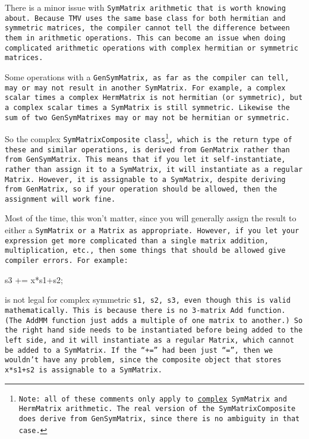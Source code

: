 There is a minor issue with \tt{SymMatrix} arithmetic that is
worth knowing about.
Because TMV uses the same base class for both hermitian and symmetric
matrices, the compiler cannot tell the difference between them in arithmetic
operations.  
This can become an issue when doing complicated arithmetic operations
with complex hermitian or symmetric matrices.

Some operations with a \tt{GenSymMatrix}, as far as the compiler can tell, may or may
not result in another \tt{SymMatrix}.  For example, a complex scalar times a complex 
\tt{HermMatrix} is not hermitian (or symmetric), but a complex scalar times a \tt{SymMatrix}
is still symmetric.
Likewise the sum of two \tt{GenSymMatrix}es may or may not be hermitian or symmetric.

So the complex \tt{SymMatrixComposite} class\footnote{
Note: all of these comments only apply to \underline{complex} \tt{SymMatrix} and \tt{HermMatrix}
arithmetic.  The real version of the \tt{SymMatrixComposite} does derive from
\tt{GenSymMatrix}, since there is no ambiguity in that case.},
which is the return type of these and similar operations, 
is derived from \tt{GenMatrix}
rather than from \tt{GenSymMatrix}.  This means that if you let it
self-instantiate, rather than assign it to a \tt{SymMatrix}, it will 
instantiate as a regular \tt{Matrix}.  However, it is assignable to a \tt{SymMatrix},
despite deriving from \tt{GenMatrix},
so if your operation should be allowed, then the assignment will work fine.

Most of the time, this won't matter, since
you will generally assign the result to either a \tt{SymMatrix} or a \tt{Matrix}
as appropriate.  However, if you let your expression get more complicated than a single
matrix addition, multiplication, etc., then some things that should be allowed give compiler errors.
For example:
\begin{tmvcode}
s3 += x*s1+s2;
\end{tmvcode}
is not legal for complex symmetric \tt{s1, s2, s3}, even though this is valid mathematically.
This is because there is no 3-matrix 
\tt{Add} function.  (The \tt{AddMM} function just adds a multiple of one 
matrix to another.)  So the right hand side needs to be instantiated before
being added to the left side, and it will instantiate as a regular \tt{Matrix},
which cannot be added to a \tt{SymMatrix}.  
If the ``\tt{+=}'' had been just ``\tt{=}'', then we wouldn't have any problem,
since the composite object that stores \tt{x*s1+s2} is assignable to a \tt{SymMatrix}.

